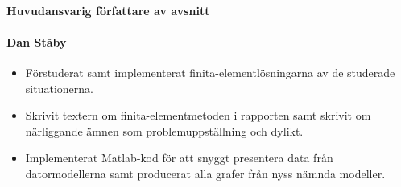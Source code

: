 \documentclass[12pt,a4paper]{article}
\begin{document}
\paragraph{Huvudansvarig författare av avsnitt}

\paragraph{Dan Ståby}
\begin{itemize}
\item Förstuderat samt implementerat finita-elementlösningarna av de studerade situationerna.
\item Skrivit textern om finita-elementmetoden i rapporten samt skrivit om närliggande ämnen som problemuppställning och dylikt. 
\item Implementerat Matlab-kod för att snyggt presentera data från datormodellerna samt producerat alla grafer från
nyss nämnda modeller.
\end{itemize}
\end{document}
